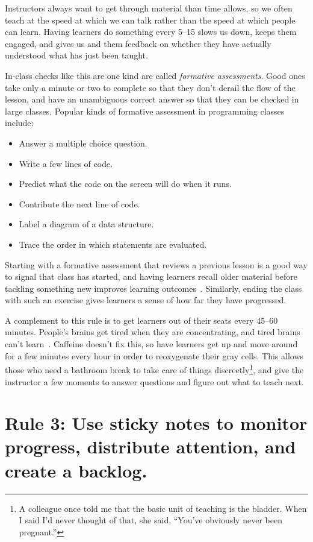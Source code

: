 \documentclass[10pt,letterpaper]{article}
\newcommand{\rulemajor}[1]{\section{#1}}
\begin{document}
Instructors always want to get through material than time allows,
so we often teach at the speed at which we can talk
rather than the speed at which people can learn.
Having learners do something every 5--15 slows us down,
keeps them engaged,
and gives us and them feedback on whether they have actually understood
what has just been taught.

In-class checks like this are one kind are called \emph{formative assessments}.
Good ones take only a minute or two to complete so that they don't derail the flow of the lesson,
and have an unambiguous correct answer so that they can be checked in large classes.
Popular kinds of formative assessment in programming classes include:

\begin{itemize}
  \item Answer a multiple choice question.
  \item Write a few lines of code.
  \item Predict what the code on the screen will do when it runs.
  \item Contribute the next line of code.
  \item Label a diagram of a data structure.
  \item Trace the order in which statements are evaluated.
\end{itemize}

Starting with a formative assessment that reviews a previous lesson
is a good way to signal that class has started,
and having learners recall older material before tackling something new
improves learning outcomes~\cite{Wein2018b}.
Similarly,
ending the class with such an exercise
gives learners a sense of how far they have progressed.

A complement to this rule is to get learners out of their seats every 45--60 minutes.
People's brains get tired when they are concentrating,
and tired brains can't learn~\cite{HPL2}.
Caffeine doesn't fix this,
so have learners get up and move around for a few minutes every hour
in order to reoxygenate their gray cells.
This allows those who need a bathroom break to take care of things discreetly\footnote{A colleague once told me that
the basic unit of teaching is the bladder.
When I said I'd never thought of that,
she said, ``You've obviously never been pregnant.''},
and give the instructor a few moments to answer questions
and figure out what to teach next.

\rulemajor{Rule 3: Use sticky notes to monitor progress, distribute attention, and create a backlog.}
\end{document}
